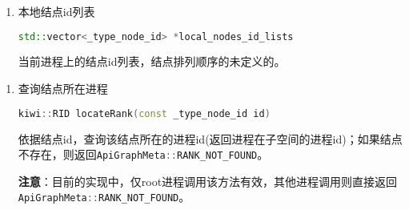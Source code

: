 \begin{enumerate}
  \item 本地结点id列表
\begin{lstlisting}[language=c++]
    std::vector<_type_node_id> *local_nodes_id_lists 
\end{lstlisting}
当前进程上的结点id列表，结点排列顺序的未定义的。

\end{enumerate}

\begin{enumerate}
\subsubsection*{GraphMeta方法}
  \item 查询结点所在进程
\begin{lstlisting}[language=c++]
    kiwi::RID locateRank(const _type_node_id id)
\end{lstlisting}
依据结点id，查询该结点所在的进程id(返回进程在子空间的进程id)；如果结点不存在，则返回\lstinline[language=c++]{ApiGraphMeta::RANK_NOT_FOUND}。

\textbf{注意}：目前的实现中，仅root进程调用该方法有效，其他进程调用则直接返回\lstinline[language=c++]{ApiGraphMeta::RANK_NOT_FOUND}。
\end{enumerate}
